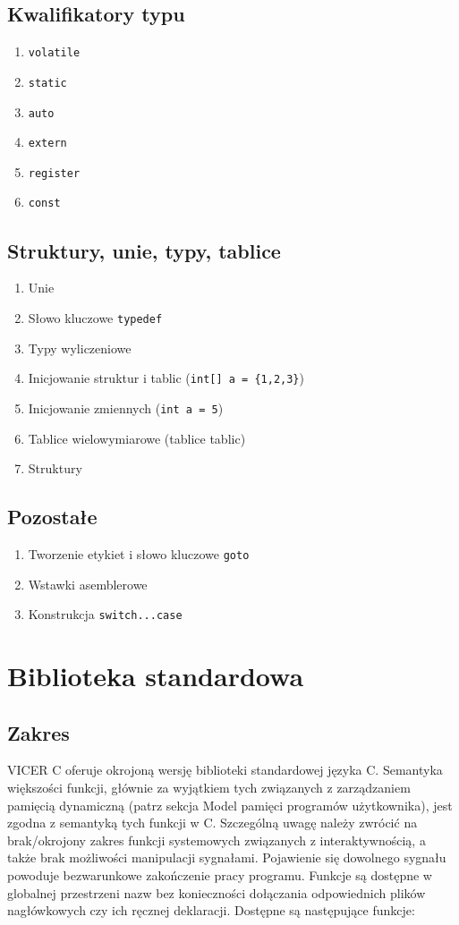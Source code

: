 \documentclass[a4paper,twoside,openright,11pt]{report}
\begin{document}
  \subsection {Kwalifikatory typu}
    \begin{enumerate}
      \item \texttt{volatile}
      \item \texttt{static}
      \item \texttt{auto}
      \item \texttt{extern}
      \item \texttt{register}
      \item \texttt{const}
    \end{enumerate}
  \subsection {Struktury, unie, typy, tablice}
    \begin{enumerate}
      \item Unie
      \item Słowo kluczowe \texttt{typedef}
      \item Typy wyliczeniowe
      \item Inicjowanie struktur i tablic (\texttt{int[] a = \{1,2,3\}})
      \item Inicjowanie zmiennych (\texttt{int a = 5})
      \item Tablice wielowymiarowe (tablice tablic) 
      \item Struktury
    \end{enumerate}
  \subsection {Pozostałe}
    \begin{enumerate}
      \item Tworzenie etykiet i słowo kluczowe \texttt{goto}
      \item Wstawki asemblerowe
      \item Konstrukcja \texttt{switch...case}
    \end{enumerate}

  \section {Biblioteka standardowa}
  \subsection {Zakres}
  \par VICER C oferuje okrojoną wersję biblioteki standardowej języka C. Semantyka większości funkcji, głównie za wyjątkiem tych związanych z zarządzaniem pamięcią dynamiczną (patrz sekcja Model pamięci programów użytkownika), jest zgodna z semantyką tych funkcji w C. Szczególną uwagę należy zwrócić na brak/okrojony zakres funkcji systemowych związanych z interaktywnością, a także brak możliwości manipulacji sygnałami. Pojawienie się dowolnego sygnału powoduje bezwarunkowe zakończenie pracy programu. Funkcje są dostępne w globalnej przestrzeni nazw bez konieczności dołączania odpowiednich plików nagłówkowych czy ich ręcznej deklaracji. Dostępne są następujące funkcje:
\end{document}
